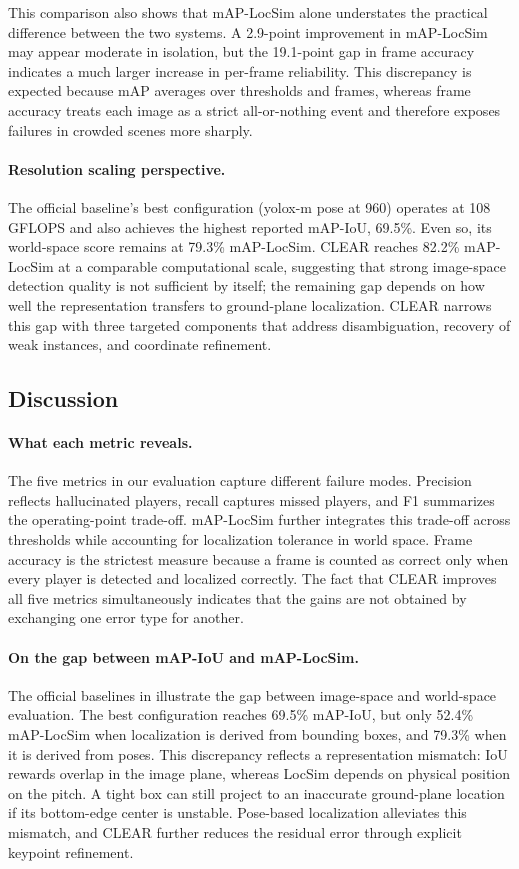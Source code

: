 This comparison also shows that mAP-LocSim alone understates the practical difference between the two systems. A 2.9-point improvement in mAP-LocSim may appear moderate in isolation, but the 19.1-point gap in frame accuracy indicates a much larger increase in per-frame reliability. This discrepancy is expected because mAP averages over thresholds and frames, whereas frame accuracy treats each image as a strict all-or-nothing event and therefore exposes failures in crowded scenes more sharply.

\paragraph{Resolution scaling perspective.}
The official baseline's best configuration (yolox-m pose at 960) operates at 108 GFLOPS and also achieves the highest reported mAP-IoU, 69.5\%. Even so, its world-space score remains at 79.3\% mAP-LocSim. CLEAR reaches 82.2\% mAP-LocSim at a comparable computational scale, suggesting that strong image-space detection quality is not sufficient by itself; the remaining gap depends on how well the representation transfers to ground-plane localization. CLEAR narrows this gap with three targeted components that address disambiguation, recovery of weak instances, and coordinate refinement.

\subsection{Discussion}
\label{sec:discussion}

\paragraph{What each metric reveals.}
The five metrics in our evaluation capture different failure modes. Precision reflects hallucinated players, recall captures missed players, and F1 summarizes the operating-point trade-off. mAP-LocSim further integrates this trade-off across thresholds while accounting for localization tolerance in world space. Frame accuracy is the strictest measure because a frame is counted as correct only when every player is detected and localized correctly. The fact that CLEAR improves all five metrics simultaneously indicates that the gains are not obtained by exchanging one error type for another.

\paragraph{On the gap between mAP-IoU and mAP-LocSim.}
The official baselines in  illustrate the gap between image-space and world-space evaluation. The best configuration reaches 69.5\% mAP-IoU, but only 52.4\% mAP-LocSim when localization is derived from bounding boxes, and 79.3\% when it is derived from poses. This discrepancy reflects a representation mismatch: IoU rewards overlap in the image plane, whereas LocSim depends on physical position on the pitch. A tight box can still project to an inaccurate ground-plane location if its bottom-edge center is unstable. Pose-based localization alleviates this mismatch, and CLEAR further reduces the residual error through explicit keypoint refinement.

